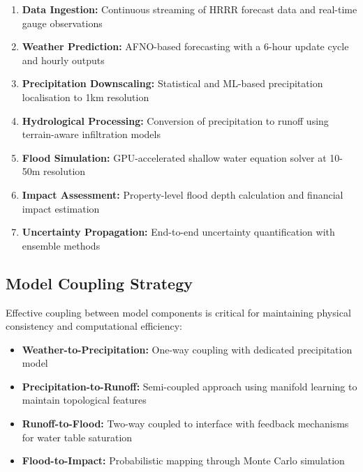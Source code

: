 \documentclass{article}
\begin{document}
\begin{enumerate}
    \item \textbf{Data Ingestion:} Continuous streaming of HRRR forecast data and real-time gauge observations
    
    \item \textbf{Weather Prediction:} AFNO-based forecasting with a 6-hour update cycle and hourly outputs
    
    \item \textbf{Precipitation Downscaling:} Statistical and ML-based precipitation localisation to 1km resolution
    
    \item \textbf{Hydrological Processing:} Conversion of precipitation to runoff using terrain-aware infiltration models
    
    \item \textbf{Flood Simulation:} GPU-accelerated shallow water equation solver at 10-50m resolution
    
    \item \textbf{Impact Assessment:} Property-level flood depth calculation and financial impact estimation
    
    \item \textbf{Uncertainty Propagation:} End-to-end uncertainty quantification with ensemble methods
\end{enumerate}

\subsection{Model Coupling Strategy}

Effective coupling between model components is critical for maintaining physical consistency and computational efficiency:

\begin{itemize}
    \item \textbf{Weather-to-Precipitation:} One-way coupling with dedicated precipitation model
    
    \item \textbf{Precipitation-to-Runoff:} Semi-coupled approach using manifold learning to maintain topological features
    
    \item \textbf{Runoff-to-Flood:} Two-way coupled to interface with feedback mechanisms for water table saturation
    
    \item \textbf{Flood-to-Impact:} Probabilistic mapping through Monte Carlo simulation
\end{itemize}
\end{document}
